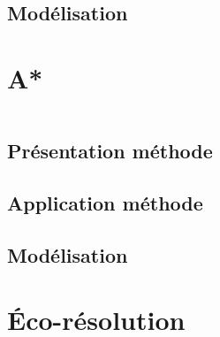 \documentclass{beamer}
\begin{document}
        \subsection{Modélisation}
        	
    
    \section{A*}
        \begin{frame}
            \begin{columns}[t]
  				\begin{column}{5cm}
  					\tableofcontents[sections={1-4}, currentsection]
  				\end{column}
  				\begin{column}{5cm}
  					\tableofcontents[sections={5-8}, currentsection]
  				\end{column}
  			\end{columns}
        \end{frame}
        \subsection{Présentation méthode}
	        
	    \subsection{Application méthode}
        	
        \subsection{Modélisation}
        	
        	
    \section{Éco-résolution}
        \begin{frame}
            \begin{columns}[t]
  				\begin{column}{5cm}
  					\tableofcontents[sections={1-4}, currentsection]
  				\end{column}
  				\begin{column}{5cm}
  					\tableofcontents[sections={5-8}, currentsection]
  				\end{column}
  			\end{columns}
        \end{frame}
\end{document}
